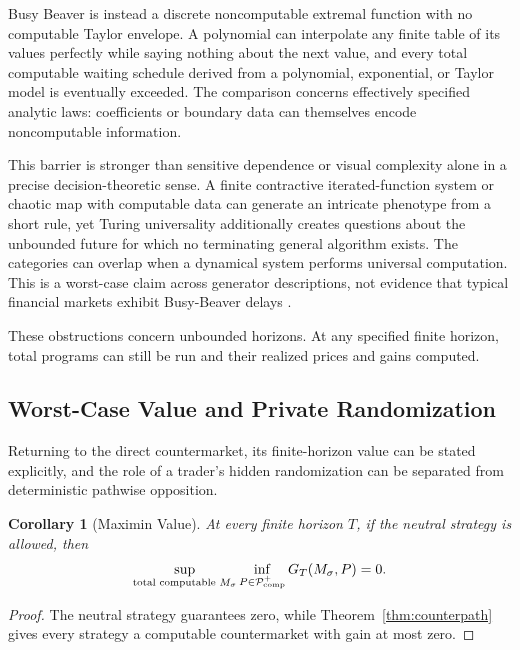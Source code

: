 \documentclass[aps,pra,reprint,superscriptaddress,amsmath,amssymb,floatfix]{revtex4-2}
\theoremstyle{plain}
\newtheorem{corollary}[theorem]{Corollary}
\theoremstyle{definition}
\theoremstyle{remark}
\begin{document}
Busy Beaver is instead a discrete noncomputable extremal function with no
computable Taylor envelope. A polynomial can interpolate any finite table of
its values perfectly while saying nothing about the next value, and every
total computable waiting schedule derived from a polynomial, exponential, or
Taylor model is eventually exceeded. The comparison concerns effectively
specified analytic laws: coefficients or boundary data can themselves encode
noncomputable information.

This barrier is stronger than sensitive dependence or visual complexity alone
in a precise decision-theoretic sense. A finite contractive iterated-function
system or chaotic map with computable data can generate an intricate phenotype
from a short rule, yet Turing universality additionally creates questions about
the unbounded future for which no terminating general algorithm exists. The
categories can overlap when a dynamical system performs universal computation.
This is a worst-case claim across generator descriptions, not evidence that
typical financial markets exhibit Busy-Beaver delays
\cite{barnsley:88,moore,calude:037103}.

These obstructions concern unbounded horizons. At any specified finite horizon,
total programs can still be run and their realized prices and gains computed.

\subsection{Worst-Case Value and Private Randomization}

Returning to the direct countermarket, its finite-horizon value can be stated
explicitly, and the role of a trader's hidden randomization can be separated
from deterministic pathwise opposition.

\begin{corollary}[Maximin Value]
  \label{cor:maximin}
  At every finite horizon \(T\), if the neutral strategy is allowed, then
  \[
    \sup_{\text{\rm total computable }M_\sigma}
    \inf_{P\in\mathcal P_{\mathrm{comp}}^{+}}
    G_T(M_\sigma,P)=0.
  \]
\end{corollary}

\begin{proof}
The neutral strategy guarantees zero, while
Theorem~\ref{thm:counterpath} gives every strategy a computable countermarket
with gain at most zero.
\end{proof}
\end{document}

